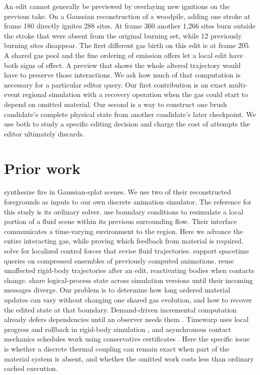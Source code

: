 \documentclass[acmtog,anonymous,review]{acmart}
\begin{document}
An edit cannot generally be previewed by overlaying new ignitions on the previous take. On a Gaussian reconstruction of a woodpile, adding one stroke at frame 180 directly ignites 288 sites. At frame 360 another 1,266 sites burn outside the stroke that were absent from the original burning set, while 12 previously burning sites disappear. The first different gas birth on this edit is at frame 205. A shared gas pool and the fine ordering of emission offers let a local edit have both signs of effect. A preview that shows the whole altered trajectory would have to preserve those interactions. We ask how much of that computation is necessary for a particular editor query. Our first contribution is an exact multi-event regional simulation with a recovery operation when the gas could start to depend on omitted material. Our second is a way to construct one brush candidate's complete physical state from another candidate's later checkpoint. We use both to study a specific editing decision and charge the cost of attempts the editor ultimately discards.

\section{Prior work}
\citet{shen2026} synthesize fire in Gaussian-splat scenes. We use two of their reconstructed foregrounds as inputs to our own discrete animation simulator. The reference for this study is its ordinary solver. \citet{bojsen2016} use boundary conditions to resimulate a local portion of a fluid scene within its previous surrounding flow. Their interface communicates a time-varying environment to the region. Here we advance the entire interacting gas, while proving which feedback from material is required. \citet{chen2026} solve for localized control forces that revise fluid trajectories. \citet{goel2022} support spacetime queries on compressed ensembles of previously computed animations. \citet{twigg2007} reuse unaffected rigid-body trajectories after an edit, reactivating bodies when contacts change. \citet{hybinette2001} share logical-process state across simulation versions until their incoming messages diverge. Our problem is to determine how long ordered material updates can vary without changing one shared gas evolution, and how to recover the edited state at that boundary. Demand-driven incremental computation already defers dependencies until an observer needs them \citep{hammer2014}. Timewarp uses local progress and rollback in rigid-body simulation \citep{mirtich2000}, and asynchronous contact mechanics schedules work using conservative certificates \citep{harmon2012}. Here the specific issue is whether a discrete thermal coupling can remain exact when part of the material system is absent, and whether the omitted work costs less than ordinary cached execution.
\end{document}
